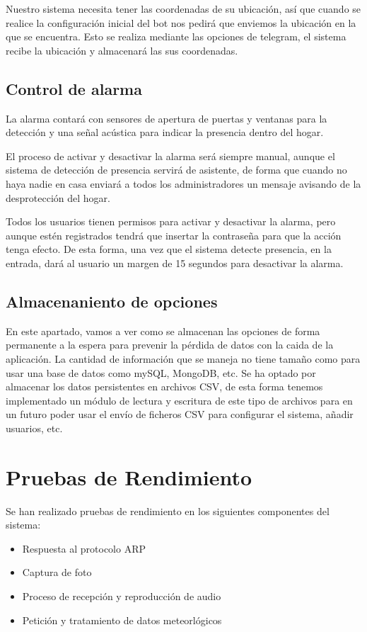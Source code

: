 \documentclass[10pt,journal,compsoc]{IEEEtran}
\begin{document}
Nuestro sistema necesita tener las coordenadas de su ubicación, así que cuando 
se realice la configuración inicial del bot nos pedirá que enviemos la ubicación 
en la que se encuentra. Esto se realiza mediante las opciones de telegram, el 
sistema recibe la ubicación y almacenará las sus coordenadas.

\subsection{Control de alarma}
La alarma contará con sensores de apertura de puertas y ventanas para la 
detección y una señal acústica para indicar la presencia dentro del hogar.

El proceso de activar y desactivar la alarma será siempre manual, aunque el 
sistema de detección de presencia servirá de asistente, de forma que cuando no 
haya nadie en casa enviará a todos los administradores un mensaje avisando de la 
desprotección del hogar. 

Todos los usuarios tienen permisos para activar y desactivar la alarma, pero 
aunque estén registrados tendrá que insertar la contraseña para que la acción 
tenga efecto. De esta forma, una vez que el sistema detecte presencia, en la 
entrada, dará al usuario un margen de 15 segundos para desactivar la alarma.

\subsection{Almacenaniento de opciones}
En este apartado, vamos a ver como se almacenan las opciones de forma permanente a la 
espera para prevenir la pérdida de datos con la caida de la aplicación. La cantidad de 
información que se maneja no tiene tamaño como para usar una base de datos como 
mySQL, MongoDB, etc. 
Se ha optado por almacenar los datos persistentes en archivos CSV, de esta forma 
tenemos implementado un módulo de lectura y escritura de este tipo de archivos para 
en un futuro poder usar el envío de ficheros CSV para configurar el sistema, añadir usuarios, etc.

\section{Pruebas de Rendimiento}\label{sec:pruebasRendimiento}
Se han realizado pruebas de rendimiento en los siguientes componentes del sistema:
\begin{itemize}
  \item Respuesta al protocolo ARP
  \item Captura de foto
  \item Proceso de recepción y reproducción de audio
  \item Petición y tratamiento de datos meteorlógicos
\end{itemize}
\end{document}
